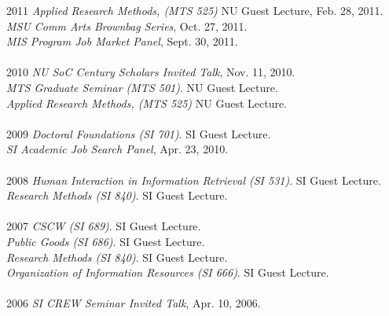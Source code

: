 \documentclass[9pt]{extarticle}
\begin{document}
\begin{tabbing}
2011 \hspace{0.3in}\= \emph{Applied Research Methods, (MTS 525)} NU Guest Lecture, Feb. 28, 2011. \\
\> \emph{MSU Comm Arts Brownbag Series}, Oct. 27, 2011. \\
\> \emph{MIS Program Job Market Panel}, Sept. 30, 2011. \\\\

2010 \hspace{0.3in}\= \emph{NU SoC Century Scholars Invited Talk}, Nov. 11, 2010. \\
\> \emph{MTS Graduate Seminar (MTS 501)}. NU Guest Lecture. \\
\> \emph{Applied Research Methods, (MTS 525)} NU Guest Lecture. \\\\

2009 \hspace{0.3in}\= \emph{Doctoral Foundations (SI 701)}. SI Guest Lecture. \\
\> \emph{SI Academic Job Search Panel}, Apr. 23, 2010. \\\\

2008 \hspace{0.3in}\= \emph{Human Interaction in Information Retrieval (SI 531)}. SI Guest Lecture. \\
\> \emph{Research Methods (SI 840)}. SI Guest Lecture. \\\\

2007 \hspace{0.3in}\= \emph{CSCW (SI 689)}. SI Guest Lecture. \\
\> \emph{Public Goods (SI 686)}. SI Guest Lecture. \\
\> \emph{Research Methods (SI 840)}. SI Guest Lecture. \\
\> \emph{Organization of Information Resources (SI 666)}. SI Guest Lecture. \\\\

2006 \hspace{0.3in}\= \emph{SI CREW Seminar Invited Talk}, Apr. 10, 2006. \\
\end{tabbing}
\end{document}
